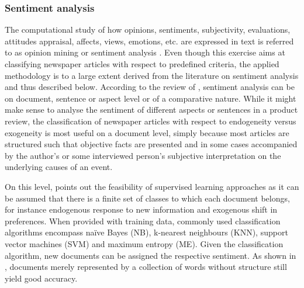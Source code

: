 %
\subsubsection{Sentiment analysis}

The computational study of how opinions, sentiments, subjectivity, evaluations, attitudes appraisal, affects, views, emotions, etc. are expressed in text is referred to as opinion mining or sentiment analysis \parencite{Liu.2012}. Even though this exercise aims at classifying newspaper articles with respect to predefined criteria, the applied methodology is to a large extent derived from the literature on sentiment analysis and thus described below. According to the review of \textcite{Feldman.2013}, sentiment analysis can be on document, sentence or aspect level or of a comparative nature. While it might make sense to analyse the sentiment of different aspects or sentences in a product review, the classification of newspaper articles with respect to endogeneity versus exogeneity is most useful on a document level, simply because most articles are structured such that objective facts are presented and in some cases accompanied by the author's or some interviewed person's subjective interpretation on the underlying causes of an event. 

On this level, \textcite{Feldman.2013} points out the feasibility of supervised learning approaches as it can be assumed that there is a finite set of classes to which each document belongs, for instance endogenous response to new information and exogenous shift in preferences. When provided with training data, commonly used classification algorithms encompass na\"{i}ve Bayes (NB), k-nearest neighbours (KNN), support vector machines (SVM) and maximum entropy (ME). Given the classification algorithm, new documents can be assigned the respective sentiment. As shown in \textcite{Pang.2002}, documents merely represented by a collection of words without structure still yield good accuracy. 

